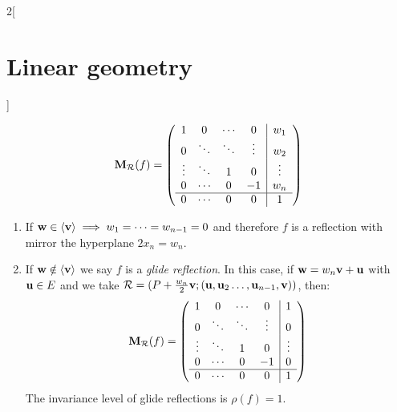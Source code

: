 \documentclass[../../../main.tex]{subfiles}
\begin{document}
\begin{multicols}{2}[\section{Linear geometry}]
\begin{proposition}
    $$\boldsymbol{\mathrm{M}}_\mathcal{R}(f)=\left(
      \begin{array}{cccc|c}
          1      & 0      & \cdots & 0      & w_1    \\
          0      & \ddots & \ddots & \vdots & w_2    \\
          \vdots & \ddots & 1      & 0      & \vdots \\
          0      & \cdots & 0      & -1     & w_n    \\
          \hline
          0      & \cdots & 0      & 0      & 1      \\
        \end{array}\right)$$
    \begin{enumerate}
      \item If $\boldsymbol{\mathrm{w}}\in\langle\boldsymbol{\mathrm{v}}\rangle\implies w_1=\cdots =w_{n-1}=0$ and therefore $f$ is a reflection with mirror the hyperplane $2x_n=w_n$.
      \item If $\boldsymbol{\mathrm{w}}\notin\langle\boldsymbol{\mathrm{v}}\rangle$ we say $f$ is a \emph{glide reflection}. In this case, if $\boldsymbol{\mathrm{w}}=w_n\boldsymbol{\mathrm{v}}+\boldsymbol{\mathrm{u}}$ with $\boldsymbol{\mathrm{u}}\in E$ and we take $\mathcal{R}=(P+\frac{w_n}{2}\boldsymbol{\mathrm{v}};(\boldsymbol{\mathrm{u}},\boldsymbol{\mathrm{u}}_2\ldots, \boldsymbol{\mathrm{u}}_{n-1},\boldsymbol{\mathrm{v}}))$, then: $$\boldsymbol{\mathrm{M}}_\mathcal{R}(f)=\left(
              \begin{array}{cccc|c}
                  1      & 0      & \cdots & 0      & 1      \\
                  0      & \ddots & \ddots & \vdots & 0      \\
                  \vdots & \ddots & 1      & 0      & \vdots \\
                  0      & \cdots & 0      & -1     & 0      \\
                  \hline
                  0      & \cdots & 0      & 0      & 1      \\
                \end{array}\right)$$ The invariance level of glide reflections is $\rho(f)=1$.
    \end{enumerate}
  \end{proposition}

\end{multicols}
\end{document}
